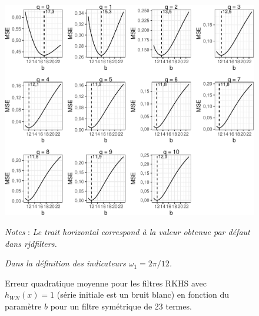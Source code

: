 \documentclass[
  11pt,
  french,
  a4paper]{article}
\newcommand\1{\mathds{1}}
\begin{document}
\begin{figure}[H]

{\centering \includegraphics{img/bookdown/pdf/rkhsoptimse11wn-1} 

}

\caption[Erreur quadratique moyenne pour les filtres RKHS avec \(h_{WN}(x)=1\) (série initiale est un bruit blanc) en fonction du paramètre \(b\) pour un filtre symétrique de 23 termes]{Erreur quadratique moyenne pour les filtres RKHS avec \(h_{WN}(x)=1\) (série initiale est un bruit blanc) en fonction du paramètre \(b\) pour un filtre symétrique de 23 termes.}\label{fig:rkhsoptimse11wn}

\footnotesize


\emph{Notes} : \emph{Le trait horizontal correspond à la valeur obtenue par défaut dans rjdfilters.}

\emph{Dans la définition des indicateurs \(\omega_1=2\pi/12\).}
\normalsize\end{figure}
\end{document}
